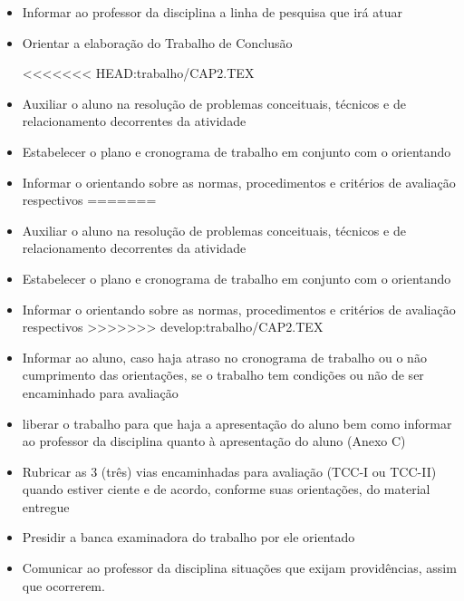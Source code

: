	\begin{itemize}
		\item Informar ao professor da disciplina a linha de pesquisa que irá atuar
	
		\item Orientar a elaboração do Trabalho de Conclusão
	
<<<<<<< HEAD:trabalho/CAP2.TEX
		\item Auxiliar o aluno na resolução de problemas conceituais, técnicos e de relacionamento decorrentes da atividade
	
		\item Estabelecer o plano e cronograma de trabalho em conjunto com o orientando
	
		\item Informar o orientando sobre as normas, procedimentos e critérios de avaliação respectivos
=======
		\item Auxiliar o aluno na resolução de problemas conceituais, t\'ecnicos e de relacionamento decorrentes da atividade
	
		\item Estabelecer o plano e cronograma de trabalho em conjunto com o orientando
	
		\item Informar o orientando sobre as normas, procedimentos e crit\'erios de avaliação respectivos
>>>>>>> develop:trabalho/CAP2.TEX
	
		\item Informar ao aluno, caso haja atraso no cronograma de trabalho ou o não cumprimento das orientações, se o trabalho tem condições ou não de ser 
		encaminhado para avaliação
	
		\item liberar o trabalho para que haja a apresentação do aluno bem como informar ao professor da disciplina quanto à apresentação do aluno (Anexo C)
	
		\item Rubricar as 3 (três) vias encaminhadas para avaliação (TCC-I ou TCC-II) quando estiver ciente e de acordo, 
		conforme suas orientações, do material entregue
	
		\item Presidir a banca examinadora do trabalho por ele orientado
	
		\item Comunicar ao professor da disciplina situações que exijam providências, assim que ocorrerem.
	\end{itemize}


